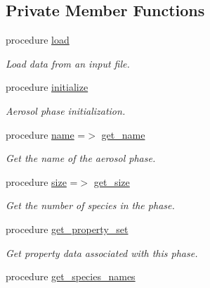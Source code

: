 \subsection*{Private Member Functions}
\begin{DoxyCompactItemize}
\item 
procedure \mbox{\hyperlink{structpmc__aero__phase__data_1_1aero__phase__data__t_abe120a4e3c2d2c03a31a536c1b503f7f}{load}}
\begin{DoxyCompactList}\small\item\em Load data from an input file. \end{DoxyCompactList}\item 
procedure \mbox{\hyperlink{structpmc__aero__phase__data_1_1aero__phase__data__t_add9e3eff795960694ccbb148832f4898}{initialize}}
\begin{DoxyCompactList}\small\item\em Aerosol phase initialization. \end{DoxyCompactList}\item 
procedure \mbox{\hyperlink{structpmc__aero__phase__data_1_1aero__phase__data__t_a7d944272e6081c318da81392fb4d8017}{name}} =$>$ \mbox{\hyperlink{namespacepmc__aero__phase__data_afdcb4ccd85ae85a97eaf71114c14722f}{get\+\_\+name}}
\begin{DoxyCompactList}\small\item\em Get the name of the aerosol phase. \end{DoxyCompactList}\item 
procedure \mbox{\hyperlink{structpmc__aero__phase__data_1_1aero__phase__data__t_a6e30ae0e08bd6733b699750976407c12}{size}} =$>$ \mbox{\hyperlink{namespacepmc__aero__phase__data_acf59c1ac8fbb92b9d922cc94d4a89571}{get\+\_\+size}}
\begin{DoxyCompactList}\small\item\em Get the number of species in the phase. \end{DoxyCompactList}\item 
procedure \mbox{\hyperlink{structpmc__aero__phase__data_1_1aero__phase__data__t_a7ed5f141109b47739621981c92138c07}{get\+\_\+property\+\_\+set}}
\begin{DoxyCompactList}\small\item\em Get property data associated with this phase. \end{DoxyCompactList}\item 
procedure \mbox{\hyperlink{structpmc__aero__phase__data_1_1aero__phase__data__t_ac7fd533ec73f8fe4d31df04c7543d3a3}{get\+\_\+species\+\_\+names}}

\end{DoxyCompactItemize}
